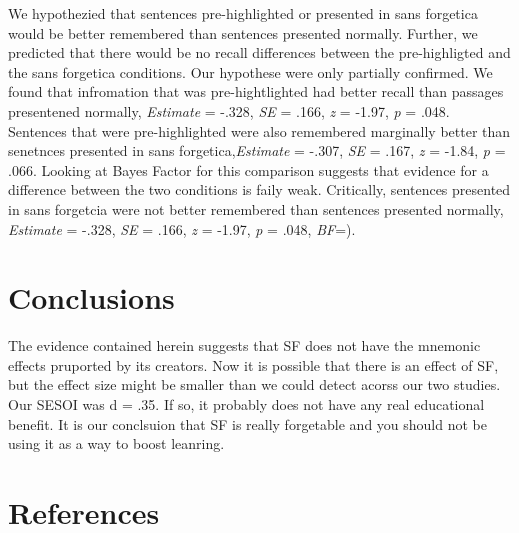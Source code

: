 \documentclass[doc]{apa6}
\begin{document}
We hypothezied that sentences pre-highlighted or presented in sans forgetica would be better remembered than sentences presented normally. Further, we predicted that there would be no recall differences between the pre-highligted and the sans forgetica conditions. Our hypothese were only partially confirmed. We found that infromation that was pre-hightlighted had better recall than passages presentened normally, \emph{Estimate} = -.328, \emph{SE} = .166, \emph{z} = -1.97, \emph{p} = .048. Sentences that were pre-highlighted were also remembered marginally better than senetnces presented in sans forgetica,\emph{Estimate} = -.307, \emph{SE} = .167, \emph{z} = -1.84, \emph{p} = .066. Looking at Bayes Factor for this comparison suggests that evidence for a difference between the two conditions is faily weak. Critically, sentences presented in sans forgetcia were not better remembered than sentences presented normally, \emph{Estimate} = -.328, \emph{SE} = .166, \emph{z} = -1.97, \emph{p} = .048, \emph{BF}=).

\hypertarget{conclusions}{%
\section{Conclusions}\label{conclusions}}

The evidence contained herein suggests that SF does not have the mnemonic effects pruported by its creators. Now it is possible that there is an effect of SF, but the effect size might be smaller than we could detect acorss our two studies. Our SESOI was d = .35. If so, it probably does not have any real educational benefit. It is our conclsuion that SF is really forgetable and you should not be using it as a way to boost leanring.

\newpage

\hypertarget{references}{%
\section{References}\label{references}}

\begingroup
\setlength{\parindent}{-0.5in}
\setlength{\leftskip}{0.5in}

\hypertarget{refs}{}

\endgroup
\end{document}
